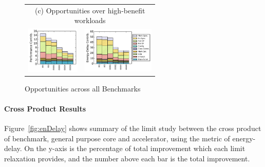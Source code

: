 \begin{figure}
\begin{center}
\begin{tabular}{m{0.26\linewidth}m{0.34\linewidth}}
\multicolumn{2}{c}{(c) Opportunities over high-benefit workloads}\\
\includegraphics[width=0.99\linewidth]{figs/opportunities-Performance-super.pdf} &
\includegraphics[width=0.99\linewidth]{figs/opportunities-Energy-Delay-super.pdf}
\end{tabular}
\vspace{-0.1in}
\caption{Opportunities across all Benchmarks}
\label{fig:oppo}  
\end{center}
\vspace{-0.2in}
\end{figure}





\paragraph{Cross Product Results}
Figure~\ref{fig:enDelay} shows summary of the limit study between the cross
product of benchmark, general purpose core and accelerator, using the metric
of energy-delay.  On the y-axis is the percentage of total improvement which 
each limit relaxation provides, and the number above each bar is the total 
improvement.  

